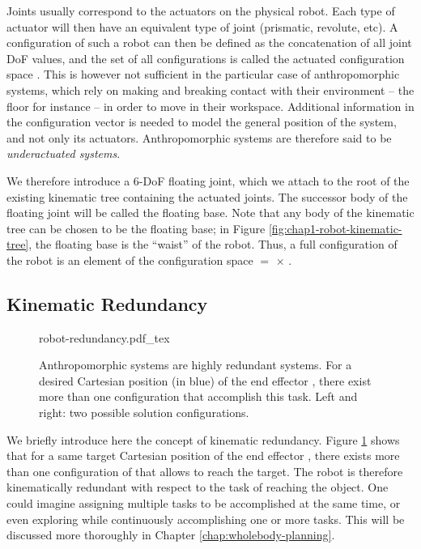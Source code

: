 Joints usually correspond to the actuators on the physical robot. Each
type of actuator will then have an equivalent type of joint
(prismatic, revolute, etc). A configuration \config{} of such a robot
can then be defined as the concatenation of all joint DoF values, and
the set of all configurations is called the actuated configuration
space {\actcspace}. This is however not sufficient in the particular
case of anthropomorphic systems, which rely on making and breaking
contact with their environment -- the floor for instance -- in order
to move in their workspace. Additional information in the
configuration vector is needed to model the general position of the
system, and not only its actuators. Anthropomorphic systems are
therefore said to be \emph{underactuated systems}.

We therefore introduce a 6-DoF floating joint, which we attach to the
root of the existing kinematic tree containing the actuated
joints. The successor body of the floating joint will be called the
floating base. Note that any body of the kinematic tree can be chosen
to be the floating base; in Figure
\ref{fig:chap1-robot-kinematic-tree}, the floating base is the
``waist'' of the robot. Thus, a full configuration \config{} of the
robot {\robot} is an element of the configuration space {\cspace} $=$
{\segroup} $\times$ {\actcspace}.
 
\subsection{Kinematic Redundancy}
\label{subsec:chap1-kinematic-redundancy}

\begin{figure}
  \centering
      {\def\svgwidth{0.8\linewidth}
        
                   {robot-redundancy.pdf_tex}}
      \caption{Anthropomorphic systems are highly redundant
        systems. For a desired Cartesian position (in blue) of the end
        effector , there exist more than one configuration
        \config{} that accomplish this task. Left and right: two
        possible solution configurations.}
      \label{fig:chap1-robot-redundancy}
\end{figure}

We briefly introduce here the concept of kinematic redundancy. Figure
\ref{fig:chap1-robot-redundancy} shows that for a same target
Cartesian position of the end effector , there exists more
than one configuration of {\robot} that allows  to
reach the target. The robot {\robot} is therefore
kinematically redundant with respect to the task of reaching the
object. One could imagine assigning multiple tasks to be accomplished
at the same time, or even exploring {\cspace} while continuously
accomplishing one or more tasks. This will be discussed more
thoroughly in Chapter \ref{chap:wholebody-planning}.

